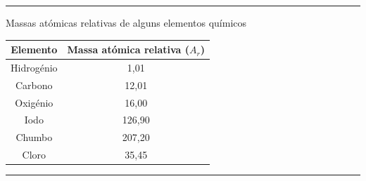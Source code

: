 \par\noindent\rule{\textwidth}{0.4pt}

\vspace{10pt}
{\Large Massas atómicas relativas de alguns elementos químicos}

\begin{center}
	\begin{tabular}{|cc|}
		
		\hline
		Elemento & Massa atómica relativa ($A_r$) \\
		\hline
		Hidrogénio & 1,01 \\
		Carbono & 12,01 \\
		Oxigénio & 16,00 \\
		Iodo & 126,90 \\
		Chumbo & 207,20 \\
		Cloro & 35,45 \\
		\hline
		
	\end{tabular}
\end{center}

\par\noindent\rule{\textwidth}{0.4pt}